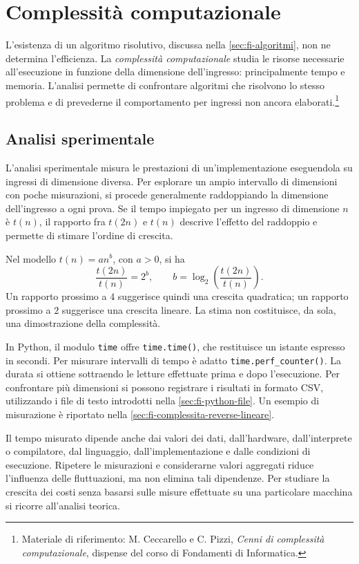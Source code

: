 \chapter{Complessità computazionale}
\label{chap:complessita}

L'esistenza di un algoritmo risolutivo, discussa nella
\cref{sec:fi-algoritmi}, non ne determina l'efficienza. La
\emph{complessità computazionale} studia le risorse necessarie
all'esecuzione in funzione della dimensione dell'ingresso: principalmente
tempo e memoria. L'analisi permette di confrontare algoritmi che
risolvono lo stesso problema e di prevederne il comportamento per
ingressi non ancora elaborati.\footnote{Materiale di riferimento:
M. Ceccarello e C. Pizzi, \emph{Cenni di complessità
computazionale}, dispense del corso di Fondamenti di Informatica.}

\section{Analisi sperimentale}
\label{sec:fi-complessita-sperimentale}

L'analisi sperimentale misura le prestazioni di un'implementazione
eseguendola su ingressi di dimensione diversa. Per esplorare un ampio
intervallo di dimensioni con poche misurazioni, si procede generalmente
raddoppiando la dimensione dell'ingresso a ogni prova. Se il tempo
impiegato per un ingresso di dimensione \(n\) è \(t(n)\), il rapporto
fra \(t(2n)\) e \(t(n)\) descrive l'effetto del raddoppio e permette
di stimare l'ordine di crescita.

Nel modello \(t(n)=an^b\), con \(a>0\), si ha
\[
  \frac{t(2n)}{t(n)}=2^b,
  \qquad
  b=\log_2\!\left(\frac{t(2n)}{t(n)}\right).
\]
Un rapporto prossimo a \(4\) suggerisce quindi una crescita quadratica;
un rapporto prossimo a \(2\) suggerisce una crescita lineare. La
stima non costituisce, da sola, una dimostrazione della complessità.

In Python, il modulo \texttt{time} offre \texttt{time.time()}, che
restituisce un istante espresso in secondi. Per misurare intervalli di
tempo è adatto \texttt{time.perf\_counter()}. La durata si ottiene
sottraendo le letture effettuate prima e dopo l'esecuzione. Per
confrontare più dimensioni si possono registrare i risultati in
formato CSV, utilizzando i file di testo introdotti nella
\cref{sec:fi-python-file}. Un esempio di misurazione è riportato
nella \cref{sec:fi-complessita-reverse-lineare}.

Il tempo misurato dipende anche dai valori dei dati, dall'hardware,
dall'interprete o compilatore, dal linguaggio, dall'implementazione e
dalle condizioni di esecuzione. Ripetere le misurazioni e considerarne valori aggregati
riduce l'influenza delle fluttuazioni, ma non elimina tali dipendenze.
Per studiare la crescita dei costi senza basarsi sulle misure
effettuate su una particolare macchina si ricorre all'analisi teorica.

